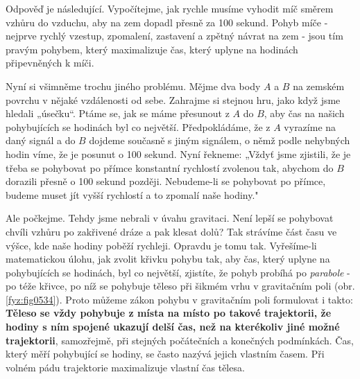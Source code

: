     Odpověď je následující. Vypočítejme, jak rychle musíme vyhodit míč směrem vzhůru do vzduchu, 
    aby na zem dopadl přesně za \num{100} sekund. Pohyb míče - nejprve rychlý vzestup, zpomalení, 
    zastavení a zpětný návrat na zem - jsou tím pravým pohybem, který maximalizuje čas, který 
    uplyne na hodinách připevněných k míči.
    
    Nyní si všimněme trochu jiného problému. Mějme dva body \(A\) a \(B\) na zemském povrchu v 
    nějaké vzdálenosti od sebe. Zahrajme si stejnou hru, jako když jsme hledali „úsečku“. Ptáme se, 
    jak se máme přesunout z \(A\) do \(B\), aby čas na našich pohybujících se hodinách byl co 
    největší. Předpokládáme, že z \(A\) vyrazíme na daný signál a do \(B\) dojdeme současně s jiným 
    signálem, o němž podle nehybných hodin víme, že je posunut o \num{100} sekund. Nyní řekneme: 
    „Vždyť jsme zjistili, že je třeba se pohybovat po přímce konstantní rychlostí zvolenou tak, 
    abychom do \(B\) dorazili přesně o \num{100} sekund později. Nebudeme-li se pohybovat po 
    přímce, budeme muset jít vyšší rychlostí a to zpomalí naše hodiny."
    
    Ale počkejme. Tehdy jsme nebrali v úvahu gravitaci. Není lepší se pohybovat chvíli vzhůru po 
    zakřivené dráze a pak klesat dolů? Tak strávíme část času ve výšce, kde naše hodiny poběží 
    rychleji. Opravdu je tomu tak. Vyřešíme-li matematickou úlohu, jak zvolit křivku pohybu tak, 
    aby čas, který uplyne na pohybujících se hodinách, byl co největší, zjistíte, že pohyb probíhá 
    po \emph{parabole} - po téže křivce, po níž se pohybuje těleso při šikmém vrhu v gravitačním 
    poli (obr. \ref{fyz:fig0534}). Proto můžeme zákon pohybu v gravitačním poli formulovat i takto: 
    \textbf{Těleso se vždy pohybuje z místa na místo po takové trajektorii, že hodiny s ním spojené 
    ukazují delší čas, než na kterékoliv jiné možné trajektorii}, samozřejmě, při stejných 
    počátečních a konečných podmínkách. Čas, který měří pohybující se hodiny, se často nazývá 
    jejich vlastním časem. Při volném pádu trajektorie maximalizuje vlastní čas tělesa. 

